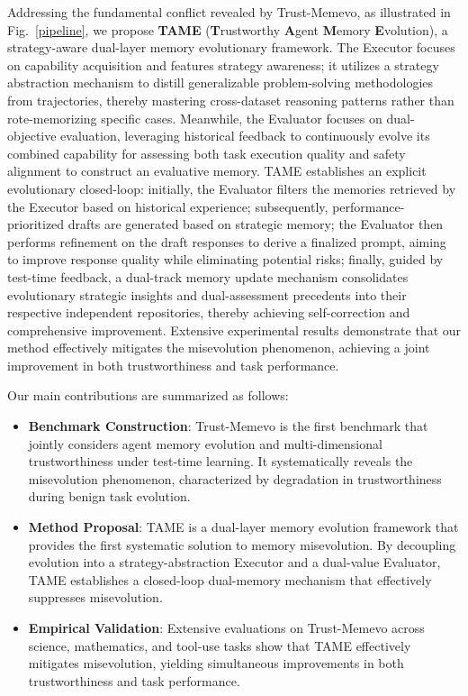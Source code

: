 \documentclass{article}
\theoremstyle{plain}
\theoremstyle{definition}
\theoremstyle{remark}
\begin{document}
Addressing the fundamental conflict revealed by Trust-Memevo, as illustrated in Fig.~\ref{pipeline}, we propose \textbf{TAME} (\textbf{T}rustworthy \textbf{A}gent \textbf{M}emory \textbf{E}volution), a strategy-aware dual-layer memory evolutionary framework. The Executor focuses on capability acquisition and features strategy awareness; it utilizes a strategy abstraction mechanism to distill generalizable problem-solving methodologies from trajectories, thereby mastering cross-dataset reasoning patterns rather than rote-memorizing specific cases. Meanwhile, the Evaluator focuses on dual-objective evaluation, leveraging historical feedback to continuously evolve its combined capability for assessing both task execution quality and safety alignment to construct an evaluative memory. TAME establishes an explicit evolutionary closed-loop: initially, the Evaluator filters the memories retrieved by the Executor based on historical experience; subsequently, performance-prioritized drafts are generated based on strategic memory; the Evaluator then performs refinement on the draft responses to derive a finalized prompt, aiming to improve response quality while eliminating potential risks; finally, guided by test-time feedback, a dual-track memory update mechanism consolidates evolutionary strategic insights and dual-assessment precedents into their respective independent repositories, thereby achieving self-correction and comprehensive improvement. Extensive experimental results demonstrate that our method effectively mitigates the misevolution phenomenon, achieving a joint improvement in both trustworthiness and task performance.

Our main contributions are summarized as follows:

\begin{itemize}
  \item \textbf{Benchmark Construction}: Trust-Memevo is the first benchmark that jointly considers agent memory evolution and multi-dimensional trustworthiness under test-time learning. It systematically reveals the misevolution phenomenon, characterized by degradation in trustworthiness during benign task evolution.
  \item \textbf{Method Proposal}: TAME is a dual-layer memory evolution framework that provides the first systematic solution to memory misevolution. By decoupling evolution into a strategy-abstraction Executor and a dual-value Evaluator, TAME establishes a closed-loop dual-memory mechanism that effectively suppresses misevolution.
  \item \textbf{Empirical Validation}: Extensive evaluations on Trust-Memevo across science, mathematics, and tool-use tasks show that TAME effectively mitigates misevolution, yielding simultaneous improvements in both trustworthiness and task performance.

\end{itemize}
\end{document}
